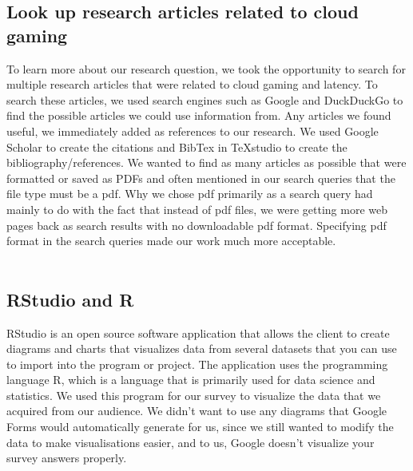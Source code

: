 \subsection{Look up research articles related to cloud gaming}
To learn more about our research question, we took the opportunity to search for multiple research articles that were related to cloud gaming and latency. To search these articles, we used search engines such as Google and DuckDuckGo to find the possible articles we could use information from. Any articles we found useful, we immediately added as references to our research. We used Google Scholar to create the citations and BibTex in TeXstudio to create the bibliography/references. We wanted to find as many articles as possible that were formatted or saved as PDFs and often mentioned in our search queries that the file type must be a pdf. Why we chose pdf primarily as a search query had mainly to do with the fact that instead of pdf files, we were getting more web pages back as search results with no downloadable pdf format. Specifying pdf format in the search queries made our work much more acceptable.
\\\\
\subsection{RStudio and R}
RStudio is an open source software application that allows the client to create diagrams and charts that visualizes data from several datasets that you can use to import into the program or project. The application uses the programming language R, which is a language that is primarily used for data science and statistics. We used this program for our survey to visualize the data that we acquired from our audience. We didn't want to use any diagrams that Google Forms would automatically generate for us, since we still wanted to modify the data to make visualisations easier, and to us, Google doesn't visualize your survey answers properly.